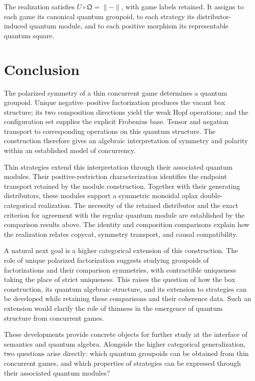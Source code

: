 \documentclass[oneside]{article}
\theoremstyle{plain}
\theoremstyle{definition}
\theoremstyle{remark}
\begin{document}
The realization satisfies \(U\circ\mathfrak Q=\lVert-\rVert\), with game labels
retained. It assigns to each game its canonical quantum groupoid, to each
strategy its distributor-induced quantum module, and to each positive
morphism its representable quantum square.

\section{Conclusion}
\label{sec:cgqg-conclusion}

The polarized symmetry of a thin concurrent game determines a quantum
groupoid. Unique negative--positive factorization produces the vacant
box structure; its two composition directions yield the weak Hopf
operations; and the configuration set supplies the explicit Frobenius
base. Tensor and negation transport to corresponding operations on this
quantum structure. The construction therefore gives an algebraic
interpretation of symmetry and polarity within an established model
of concurrency.

Thin strategies extend this interpretation through their associated
quantum modules. Their positive-restriction characterization identifies the
endpoint transport retained by the module construction. Together
with their generating distributors, these modules support a symmetric
monoidal oplax double-categorical realization. The necessity of the
retained distributor and the exact criterion for agreement with the
regular quantum module are established by the comparison results above. The identity and composition comparisons explain how the
realization relates copycat, symmetry transport, and causal
compatibility.

A natural next goal is a higher categorical extension of this
construction. The role of unique polarized factorization suggests
studying groupoids of factorizations and their comparison symmetries,
with contractible uniqueness taking the place of strict uniqueness.
This raises the question of how the box construction, its quantum
algebraic structure, and its extension to strategies can be developed
while retaining these comparisons and their coherence data. Such an
extension would clarify the role of thinness in the emergence of
quantum structure from concurrent games.

These developments provide concrete objects for further study at the
interface of semantics and quantum algebra. Alongside the higher
categorical generalization, two questions arise directly: which quantum
groupoids can be obtained from thin concurrent games, and which
properties of strategies can be expressed through their associated
quantum modules?
\end{document}
